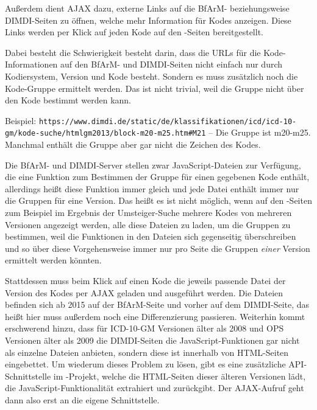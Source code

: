 Außerdem dient AJAX dazu, externe Links auf die BfArM- beziehungsweise DIMDI-Seiten zu öffnen, welche mehr Information für Kodes anzeigen. Diese Links werden per Klick auf jeden Kode auf den \bfarmer-Seiten bereitgestellt.

Dabei besteht die Schwierigkeit besteht darin, dass die URLs für die Kode-Informationen auf den BfArM- und DIMDI-Seiten nicht einfach nur durch Kodiersystem, Version und Kode besteht. Sondern es muss zusätzlich noch die Kode-Gruppe ermittelt werden. Das ist nicht trivial, weil die Gruppe nicht über den Kode bestimmt werden kann. 

Beispiel: \texttt{https://www.dimdi.de/static/de/klassifikationen/icd/icd-10-gm/\newline kode-suche/htmlgm2013/block-m20-m25.htm\#M21} -- Die Gruppe ist m20-m25. Manchmal enthält die Gruppe aber gar nicht die Zeichen des Kodes.

Die BfArM- und DIMDI-Server stellen zwar JavaScript-Dateien zur Verfügung, die eine Funktion zum Bestimmen der Gruppe für einen gegebenen Kode enthält, allerdings heißt diese Funktion immer gleich und jede Datei enthält immer nur die Gruppen für eine Version. Das heißt es ist nicht möglich, wenn auf den \bfarmer-Seiten zum Beispiel im Ergebnis der Umsteiger-Suche mehrere Kodes von mehreren Versionen angezeigt werden, alle diese Dateien zu laden, um die Gruppen zu bestimmen, weil die Funktionen in den Dateien sich gegenseitig überschreiben und so über diese Vorgehensweise immer nur pro Seite die Gruppen \emph{einer} Version ermittelt werden könnten. 

Stattdessen muss beim Klick auf einen Kode die jeweils passende Datei der Version des Kodes per AJAX geladen und ausgeführt werden. Die Dateien befinden sich ab 2015 auf der BfArM-Seite und vorher auf dem DIMDI-Seite, das heißt hier muss außerdem noch eine Differenzierung passieren. Weiterhin kommt erschwerend hinzu, dass für ICD-10-GM Versionen älter als 2008 und OPS Versionen älter als 2009 die DIMDI-Seiten die JavaScript-Funktionen gar nicht als einzelne Dateien anbieten, sondern diese ist innerhalb von HTML-Seiten eingebettet. Um wiederum dieses Problem zu lösen, gibt es eine zusätzliche API-Schnittstelle im \bfarmer-Projekt, welche die HTML-Seiten dieser älteren Versionen lädt, die JavaScript-Funktionalität extrahiert und zurückgibt. Der AJAX-Aufruf geht dann also erst an die eigene Schnittstelle.

